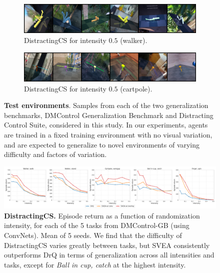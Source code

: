 \begin{figure}
    \begin{subfigure}[b]{0.48\textwidth}
        \centering
        \includegraphics[width=\textwidth]{figures/visualizations/obs_env_dcs_extreme.png}
        \caption{DistractingCS for intensity $0.5$ (walker).}
        \vspace{0.1in}
    \end{subfigure}
    \begin{subfigure}[b]{0.48\textwidth}
        \centering
        \includegraphics[width=\textwidth]{figures/visualizations/obs_cartpole_env_dcs_extreme.png}
        \caption{DistractingCS for intensity $0.5$ (cartpole).}
        \vspace{0.1in}
    \end{subfigure}
    \vspace{-0.1in}
    \caption{\textbf{Test environments}. Samples from each of the two generalization benchmarks, DMControl Generalization Benchmark and Distracting Control Suite, considered in this study. In our experiments, agents are trained in a fixed training environment with no visual variation, and are expected to generalize to novel environments of varying difficulty and factors of variation.}
    \label{fig:test-env-visualization}
    \vspace{-0.15in}
\end{figure}

\begin{figure}
    \centering
    \includegraphics[width=\textwidth]{figures/dcs_individual.pdf}
    \vspace{-0.2in}
    \caption{\textbf{DistractingCS.} Episode return as a function of randomization intensity, for each of the 5 tasks from DMControl-GB (using ConvNets). Mean of 5 seeds. We find that the difficulty of DistractingCS varies greatly between tasks, but SVEA consistently outperforms DrQ in terms of generalization across all intensities and tasks, except for \textit{Ball in cup, catch} at the highest intensity.}
    \label{fig:dmc-dcs-individual}
    \vspace{-0.05in}
\end{figure}